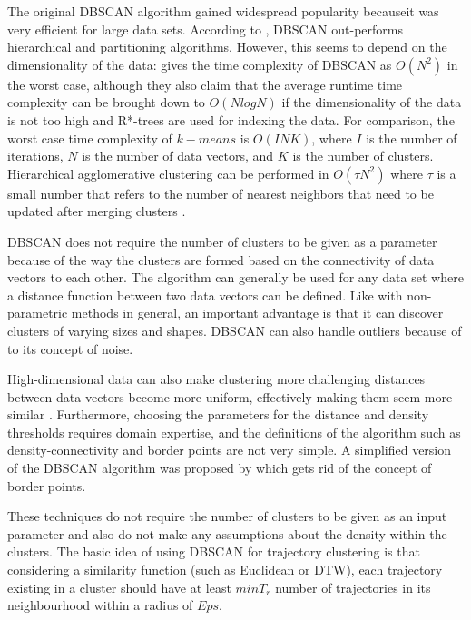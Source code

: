 \documentclass[a4paper, 12pt]{article}
\begin{document}
The original DBSCAN algorithm gained widespread popularity becauseit was very efficient for large data sets. According to \cite{kotsiantis2004recent}, DBSCAN out-performs hierarchical and partitioning algorithms. However, this seems to depend on the dimensionality of the data: \cite{kriegel2011density} gives the time complexity of DBSCAN as $O(N^2)$ in the worst case, although they also claim that the average runtime time complexity can be brought down to $O(NlogN)$ if the dimensionality of the data is not too high and R*-trees are used for indexing the data. For comparison, the worst case time complexity of $k-means$ is $O(INK)$, where $I$ is the number of iterations, $N$ is the number of data vectors, and $K$ is the number of clusters. Hierarchical agglomerative clustering can be performed in $O(\tau N^2)$ where $\tau$ is a small number that refers to the number of nearest neighbors that need to be updated after merging clusters \citep{franti2006fast}.

DBSCAN does not require the number of clusters to be given as a parameter because of the way the clusters are formed based on the connectivity of data vectors to each other. The algorithm can generally be used for any data set where a distance function between two data vectors can be defined. Like with non-parametric methods in general, an important advantage is that it can discover clusters of varying sizes and shapes. DBSCAN can also handle outliers because of to its concept of noise.

High-dimensional data can also make clustering more challenging distances between data vectors become more uniform, effectively making them seem more similar \citep{ertoz2003finding}. Furthermore, choosing the parameters for the distance and density thresholds requires domain expertise, and the definitions of the algorithm such as density-connectivity and border points are not very simple. A simplified version of the DBSCAN algorithm was proposed by \cite{campello2013density} which gets rid of the concept of border points.

These techniques do not require the number of clusters to be given as an input parameter and also do not make any assumptions about the density within the clusters. The basic idea of using DBSCAN for trajectory clustering is that considering a similarity function (such as Euclidean or DTW), each trajectory existing in a cluster should have at least $min T_{r}$ number of trajectories in its neighbourhood within a radius of $Eps$.
\end{document}
